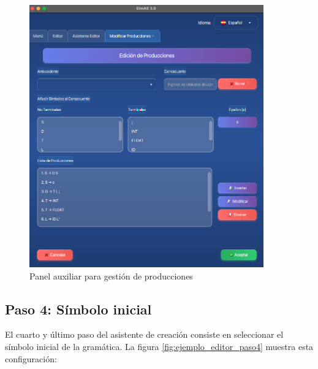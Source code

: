\needspace{8cm}
\begin{figure}[H]
    \centering
    \includegraphics[width=0.9\textwidth]{figuras/ejemplo_practico/insertar_producciones.png}
    \caption{Panel auxiliar para gestión de producciones}
    \label{fig:ejemplo_insertar_producciones}
\end{figure}

\subsection{Paso 4: Símbolo inicial}

El cuarto y último paso del asistente de creación consiste en seleccionar el símbolo inicial de la gramática. La figura \ref{fig:ejemplo_editor_paso4} muestra esta configuración:

